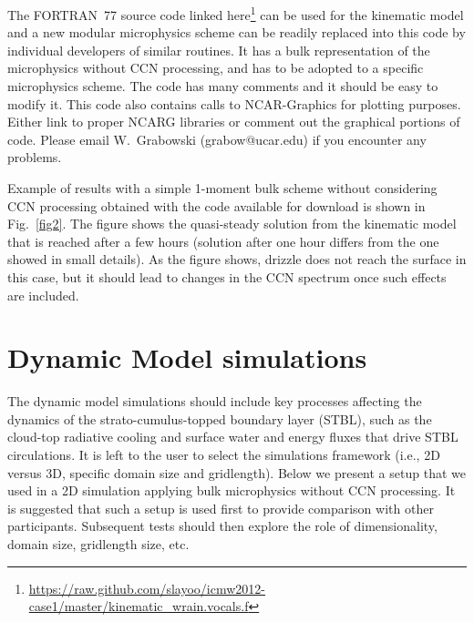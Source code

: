 \documentclass{article}
\begin{document}
  The FORTRAN~77 source code linked here\footnote{\url{https://raw.github.com/slayoo/icmw2012-case1/master/kinematic_wrain.vocals.f}} 
    can be used for the kinematic model and a new modular microphysics scheme can be readily replaced 
    into this code by individual developers of similar routines. 
  It has a bulk representation of the microphysics without CCN processing, 
    and has to be adopted to a specific microphysics scheme. 
  The code has many comments and it should be easy to modify it. 
  This code also contains calls to NCAR-Graphics for plotting purposes. 
  Either link to proper NCARG libraries or comment out the graphical portions of code.
  Please email W.~Grabowski (grabow@ucar.edu) if you encounter any problems. 

  Example of results with a simple 1-moment bulk scheme without considering CCN processing 
    obtained with the code available for download is shown in Fig.~\ref{fig2}. 
  The figure shows the quasi-steady solution from the kinematic model that is reached 
    after a few hours (solution after one hour differs from the one showed in small details). 
  As the figure shows, drizzle does not reach the surface in this case, but it should lead 
    to changes in the CCN spectrum once such effects are included.

  \clearpage

  \section{Dynamic Model simulations}

  The dynamic model simulations should include key processes affecting 
    the dynamics of the strato-cumulus-topped boundary layer (STBL), 
    such as the cloud-top radiative cooling and surface water and energy 
    fluxes that drive STBL circulations. 
  It is left to the user to select the simulations framework (i.e., 2D versus 3D, 
    specific domain size and gridlength). 
  Below we present a setup that we used in a 2D simulation applying bulk 
    microphysics without CCN processing. 
  It is suggested that such a setup is used first to provide comparison with 
    other participants. 
  Subsequent tests should then explore the role of dimensionality, 
    domain size, gridlength size, etc.
\end{document}
